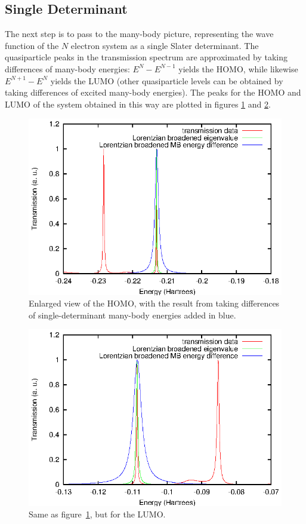 \subsection{Single Determinant}
\label{subsec:SingleDeterminant}

The next step is to pass to the many-body picture, representing the wave
function of the $N$ electron system as a single Slater determinant. The
quasiparticle peaks in the transmission spectrum are approximated by taking
differences of many-body energies: $E^N - E^{N-1}$ yields the HOMO, while
likewise $E^{N+1} - E^N$ yields the LUMO (other quasiparticle levels can be
obtained by taking differences of excited many-body energies). The peaks for
the HOMO and LUMO of the system obtained in this way are plotted in figures
\ref{fig:nobranch_homo} and \ref{fig:nobranch_lumo}.

\begin{figure}
	\begin{center}
		\includegraphics[width=0.9\linewidth]{figures/nobranch_homo}
	\end{center}
	\caption{Enlarged view of the HOMO, with the result from taking
	differences of single-determinant many-body energies added in blue.}
	\label{fig:nobranch_homo}
\end{figure}

\begin{figure}
	\begin{center}
		\includegraphics[width=0.9\linewidth]{figures/nobranch_lumo}
	\end{center}
	\caption{Same as figure~\ref{fig:nobranch_homo}, but for the LUMO.}
	\label{fig:nobranch_lumo}
\end{figure}

